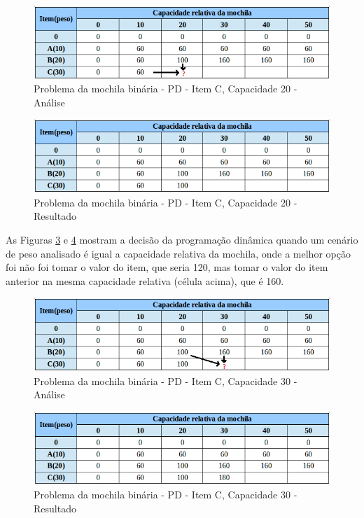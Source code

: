 \begin{itemize}
\FloatBarrier
\begin{figure}[!h]
\centering
\includegraphics[keepaspectratio=true,scale=0.6]{figuras/mochila30_20.png}
\caption{Problema da mochila binária - PD - Item C, Capacidade 20 - Análise}
\label{mochila30_20}
\end{figure}

\FloatBarrier
\begin{figure}[!h]
\centering
\includegraphics[keepaspectratio=true,scale=0.6]{figuras/mochila30_20_resp.png}
\caption{Problema da mochila binária - PD - Item C, Capacidade 20 - Resultado}
\label{mochila30_20_resp}
\end{figure}

As Figuras \ref{mochila30_30} e \ref{mochila30_30_resp} mostram a decisão da programação dinâmica quando um cenário de peso analisado é igual a capacidade relativa da mochila, onde a melhor opção foi não foi tomar o valor do item, que seria 120, mas tomar o valor do item anterior na mesma capacidade relativa (célula acima), que é 160.
\FloatBarrier
\begin{figure}[!h]
\centering
\includegraphics[keepaspectratio=true,scale=0.6]{figuras/mochila30_30.png}
\caption{Problema da mochila binária - PD - Item C, Capacidade 30 - Análise}
\label{mochila30_30}
\end{figure}

\FloatBarrier
\begin{figure}[!h]
\centering
\includegraphics[keepaspectratio=true,scale=0.6]{figuras/mochila30_30_resp.png}
\caption{Problema da mochila binária - PD - Item C, Capacidade 30 - Resultado}
\label{mochila30_30_resp}
\end{figure}


\end{itemize}
